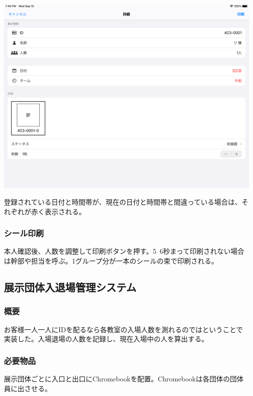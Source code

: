 \documentclass[dvipdfmx,jb5]{jarticle}
\begin{document}
\begin{enumerate}
   \includegraphics[scale=0.2]{assets/entrance-system.png}
 \end{enumerate}
    登録されている日付と時間帯が、現在の日付と時間帯と間違っている場合は、それぞれが赤く表示される。
 \subsubsection{シール印刷}
 本人確認後、人数を調整して印刷ボタンを押す。5~6秒まって印刷されない場合は幹部や担当を呼ぶ。1グループ分が一本のシールの束で印刷される。
\subsection{展示団体入退場管理システム}
\subsubsection{概要}
お客様一人一人にIDを配るなら各教室の入場人数を測れるのではということで実装した。入場退場の人数を記録し、現在入場中の人を算出する。
\subsubsection{必要物品}
展示団体ごとに入口と出口にChromebookを配置。Chromebookは各団体の団体員に出させる。
\end{document}
